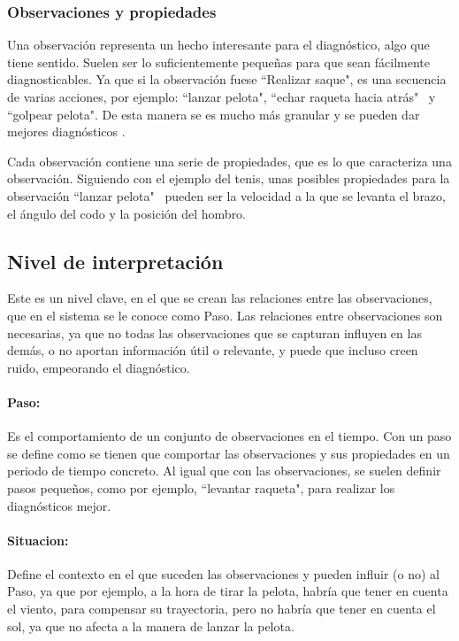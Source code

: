 \subsubsection{Observaciones y propiedades}
Una observaci\'on representa un hecho interesante para el diagn\'ostico, algo que tiene sentido. Suelen
ser lo suficientemente peque\~nas para que sean f\'acilmente diagnosticables. Ya que si la observaci\'on
fuese ``Realizar saque", es una secuencia de varias acciones, por ejemplo: ``lanzar pelota", ``echar raqueta hacia atr\'as" \
y ``golpear pelota". De esta manera se es mucho m\'as granular y se pueden dar mejores diagn\'osticos \cite{INTRASIM:Manual}.

Cada observaci\'on contiene una serie de propiedades, que es lo que caracteriza una observaci\'on. 
Siguiendo con el ejemplo del tenis, unas posibles propiedades para la observaci\'on ``lanzar pelota" \
pueden ser la velocidad a la que se levanta el brazo, el \'angulo del codo y la posici\'on del hombro.

\subsection{Nivel de interpretaci\'on}
Este es un nivel clave, en el que se crean las relaciones entre las observaciones, que en el sistema se le conoce como Paso.
Las relaciones entre observaciones son necesarias, ya que no todas las observaciones que se capturan influyen en las dem\'as,
o no aportan informaci\'on \'util o relevante, y puede que incluso creen ruido, empeorando el diagn\'ostico.

\paragraph{\textbf{Paso:}}
Es el comportamiento de un conjunto de observaciones en el tiempo. Con un paso se define como se tienen
que comportar las observaciones y sus propiedades en un periodo de tiempo concreto. Al igual que con las observaciones,
se suelen definir pasos peque\~nos, como por ejemplo, ``levantar raqueta", para realizar los diagn\'osticos mejor.

\paragraph{\textbf{Situacion:}}
Define el contexto en el que suceden las observaciones y pueden influir (o no) al Paso, ya que por ejemplo, a la hora
de tirar la pelota, habr\'ia que tener en cuenta el viento, para compensar su trayectoria, pero no habr\'ia que tener
en cuenta el sol, ya que no afecta a la manera de lanzar la pelota.

